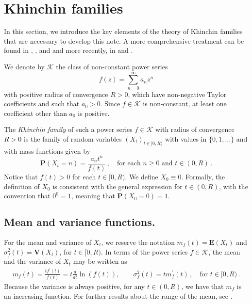 \documentclass[11pt,a4paper,leqno]{amsart}
\theoremstyle{plain}
\newtheorem{lem}[theo]{Lemma}
\theoremstyle{definition}
\numberwithin{equation}{section}
\def\E{\mathbf{E}}
\def\V{\mathbf{V}}
\def\P{\mathbf{P}}
\def\K{\mathcal{K}}
\begin{document}
	\section{Khinchin families}
	
	In this section, we introduce the key elements of the theory of Khinchin families that are necessary to develop this note. A more comprehensive treatment can be found in \cite{CFFM1}, \cite{CFFM2}, \cite{CFFM3} and \cite{K_dos} and more recently, in \cite{MaciaThesis} and \cite{MaciaGaussian}.
	\medskip
	
	We denote by $\K$ the class of non-constant power series
	$$f(z)=\sum_{n=0}^\infty a_n z^n$$  with positive radius of convergence $R>0$,  which have non-negative Taylor coefficients and such that  $a_0>0$. Since $f \in \K$ is non-constant, at least one coefficient other than $a_0$ is positive.
	\medskip
	
	The \textit{Khinchin  family} of  such a  power series $f \in \K$ with radius of convergence $R>0$ is the family of random variables $(X_t)_{t \in [0,R)}$ with values in $\{0, 1, \ldots\}$ and with mass functions given by
	$$
	\P(X_t=n)=\frac{a_n t^n}{f(t)}\, , \quad \mbox{for each $n \ge 0$ and $t \in (0,R)$}\, .$$  Notice that $f(t)>0$ for each $t \in[0,R)$. We define $X_0\equiv 0$. 
	Formally, the definition of $X_0$ is consistent with the general expression for $t \in (0,R)$, with the convention that $0^0 = 1$, meaning that $\P(X_0 = 0) = 1$.
	\subsection{Mean and variance functions.} \label{section: mean and variance}
	
	For the mean and variance of $X_t$, we reserve the notation
	$m_f(t)=\E(X_t)$ and $\sigma_f^2(t)=\V(X_t)$, for $t \in [0,R)$. In terms of the power series $f \in \K$, the  mean and the variance of $X_t$ may be  written as
	\begin{align}\label{eq:m and sigma in terms of f}
		m_f(t)=\frac{t f^\prime(t)}{f(t)} = t\frac{d}{dt}\ln(f(t)), \qquad \sigma_f^2(t)=t m_f^\prime(t)\, , \quad \mbox{for $t \in [0,R)$}\,.
	\end{align}
	Because the variance is always positive, for any $t \in (0,R)$, we have that $m_{f}$ is an increasing function. For further results about the range of the mean, see \cite{CFFM1}.
	\smallskip
	
	
\end{document}
